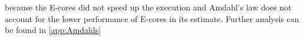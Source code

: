 because the E-cores did not speed up the execution and Amdahl's law does not account for the lower performance of E-cores in its estimate. Further analysis can be found in \cref{app:Amdahls}



